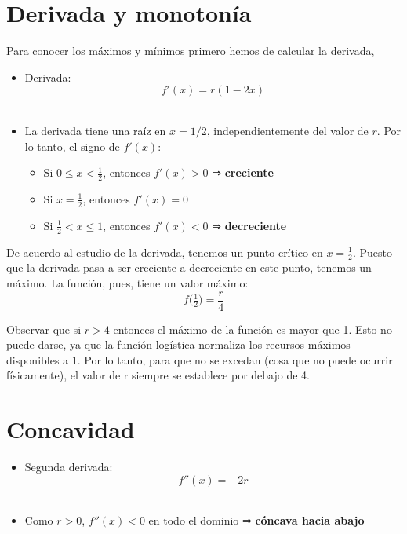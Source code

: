 \documentclass[
  11pt,
  a4paper,
  DIV=11,
  numbers=noendperiod]{scrreprt}
\providecommand{\tightlist}{%
  \setlength{\itemsep}{0pt}\setlength{\parskip}{0pt}}
\begin{document}
\section{Derivada y monotonía}\label{derivada-y-monotonuxeda}

Para conocer los máximos y mínimos primero hemos de calcular la
derivada,

\begin{itemize}
\tightlist
\item
  Derivada:\\
  \[f'(x) = r(1 - 2x)\]\\
\item
  La derivada tiene una raíz en \(x=1/2\), independientemente del valor
  de \(r\). Por lo tanto, el signo de \(f'(x)\):

  \begin{itemize}
  \tightlist
  \item
    Si \(0 \le x < \tfrac12\), entonces \(f'(x) > 0\) ⇒
    \textbf{creciente}\\
  \item
    Si \(x = \tfrac12\), entonces \(f'(x) = 0\)\\
  \item
    Si \(\tfrac12 < x \le 1\), entonces \(f'(x) < 0\) ⇒
    \textbf{decreciente}
  \end{itemize}
\end{itemize}

De acuerdo al estudio de la derivada, tenemos un punto crítico en
\(x = \tfrac12\). Puesto que la derivada pasa a ser creciente a
decreciente en este punto, tenemos un máximo. La función, pues, tiene un
valor máximo:\\
\[f\bigl(\tfrac12\bigr) = \frac{r}{4}\]

Observar que si \(r>4\) entonces el máximo de la función es mayor que 1.
Esto no puede darse, ya que la funcíón logística normaliza los recursos
máximos disponibles a 1. Por lo tanto, para que no se excedan (cosa que
no puede ocurrir físicamente), el valor de r siempre se establece por
debajo de 4.

\section{Concavidad}\label{concavidad}

\begin{itemize}
\tightlist
\item
  Segunda derivada:\\
  \[f''(x) = -2r\]\\
\item
  Como \(r>0\), \(f''(x)<0\) en todo el dominio ⇒ \textbf{cóncava hacia
  abajo}
\end{itemize}
\end{document}
